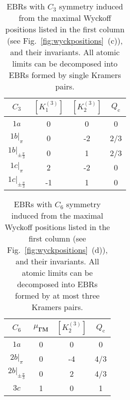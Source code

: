 \begin{table}[H]
\centering
\begin{tabular}{|c||c|c||c|}
\hline
$C_3$ & $[K^{(3)}_1]$ & $[K^{(3)}_2]$ & $Q_\mathrm{c}$ \\ \hline
$1a$  & 0                      & 0                      & 0               \\ \hline
$1b|_{\pi}$  & 0                      & -2                      & 2/3               \\ \hline
$1b|_{\pm \frac{\pi}{3}}$  & 0                      & 1                      & 2/3               \\ \hline
$1c|_{\pi}$  & 2                      & -2                      & 0               \\ \hline
$1c|_{\pm \frac{\pi}{3}}$  & -1                      & 1                      & 0               \\ \hline
\end{tabular}
\caption[EBRs with $C_3$ symmetry induced from the maximal Wyckoff positions and their invariants]{EBRs with $C_3$ symmetry induced from the maximal Wyckoff positions listed in the first column (see Fig.~\ref{fig:wyckpositions}~(c)), and their invariants. All atomic limits can be decomposed into EBRs formed by single Kramers pairs.}
\label{tab:EBRc3}
\end{table}

\begin{table}[H]
\centering
\begin{tabular}{|c||c|c||c|}
\hline
$C_6$ & $\mu_{\mathbf{\Gamma M}}$ & $[K^{(3)}_2]$ & $Q_\mathrm{c}$ \\ \hline
$1a$  & 0                      & 0                      & 0               \\ \hline
$2b|_{\pi}$  & 0                      & -4                      & 4/3               \\ \hline
$2b|_{\pm \frac{\pi}{3}}$  & 0                      & 2                      & 4/3               \\ \hline
$3c$  & 1                      & 0                      & 1               \\ \hline
\end{tabular}
\caption[EBRs with $C_6$ symmetry induced from the maximal Wyckoff positions and their invariants]{EBRs with $C_6$ symmetry induced from the maximal Wyckoff positions listed in the first column (see Fig.~\ref{fig:wyckpositions}~(d)), and their invariants. All atomic limits can be decomposed into EBRs formed by at most three Kramers pairs.}
\label{tab:EBRc6}
\end{table}

